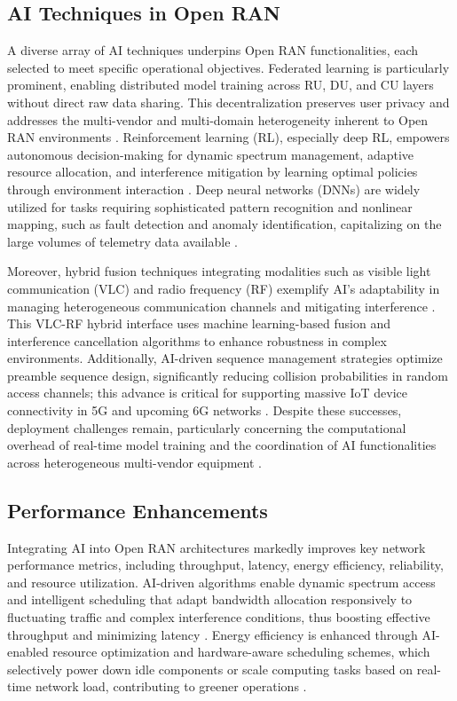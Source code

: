 \subsection{AI Techniques in Open RAN}

A diverse array of AI techniques underpins Open RAN functionalities, each selected to meet specific operational objectives. Federated learning is particularly prominent, enabling distributed model training across RU, DU, and CU layers without direct raw data sharing. This decentralization preserves user privacy and addresses the multi-vendor and multi-domain heterogeneity inherent to Open RAN environments \cite{ref54}. Reinforcement learning (RL), especially deep RL, empowers autonomous decision-making for dynamic spectrum management, adaptive resource allocation, and interference mitigation by learning optimal policies through environment interaction \cite{ref21,ref22}. Deep neural networks (DNNs) are widely utilized for tasks requiring sophisticated pattern recognition and nonlinear mapping, such as fault detection and anomaly identification, capitalizing on the large volumes of telemetry data available \cite{ref23,ref24}.

Moreover, hybrid fusion techniques integrating modalities such as visible light communication (VLC) and radio frequency (RF) exemplify AI’s adaptability in managing heterogeneous communication channels and mitigating interference \cite{ref25}. This VLC-RF hybrid interface uses machine learning-based fusion and interference cancellation algorithms to enhance robustness in complex environments. Additionally, AI-driven sequence management strategies optimize preamble sequence design, significantly reducing collision probabilities in random access channels; this advance is critical for supporting massive IoT device connectivity in 5G and upcoming 6G networks \cite{ref21}. Despite these successes, deployment challenges remain, particularly concerning the computational overhead of real-time model training and the coordination of AI functionalities across heterogeneous multi-vendor equipment \cite{ref49}.

\subsection{Performance Enhancements}

Integrating AI into Open RAN architectures markedly improves key network performance metrics, including throughput, latency, energy efficiency, reliability, and resource utilization. AI-driven algorithms enable dynamic spectrum access and intelligent scheduling that adapt bandwidth allocation responsively to fluctuating traffic and complex interference conditions, thus boosting effective throughput and minimizing latency \cite{ref54}. Energy efficiency is enhanced through AI-enabled resource optimization and hardware-aware scheduling schemes, which selectively power down idle components or scale computing tasks based on real-time network load, contributing to greener operations \cite{ref49}.

